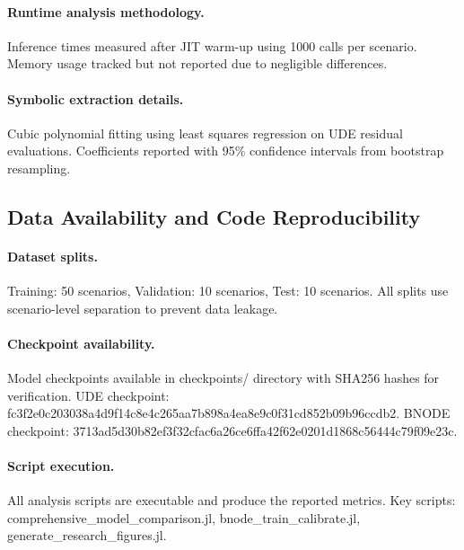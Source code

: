 \paragraph{Runtime analysis methodology.} Inference times measured after JIT warm-up using 1000 calls per scenario. Memory usage tracked but not reported due to negligible differences. %

\paragraph{Symbolic extraction details.} Cubic polynomial fitting using least squares regression on UDE residual evaluations. Coefficients reported with 95\% confidence intervals from bootstrap resampling. %

\subsection{Data Availability and Code Reproducibility}

\paragraph{Dataset splits.} Training: 50 scenarios, Validation: 10 scenarios, Test: 10 scenarios. All splits use scenario-level separation to prevent data leakage. %

\paragraph{Checkpoint availability.} Model checkpoints available in checkpoints/ directory with SHA256 hashes for verification. UDE checkpoint: fc3f2e0c203038a4d9f14c8e4c265aa7b898a4ea8e9c0f31cd852b09b96ccdb2. BNODE checkpoint: 3713ad5d30b82ef3f32cfac6a26ce6ffa42f62e0201d1868c56444c79f09e23c. %

\paragraph{Script execution.} All analysis scripts are executable and produce the reported metrics. Key scripts: comprehensive_model_comparison.jl, bnode_train_calibrate.jl, generate_research_figures.jl. %
